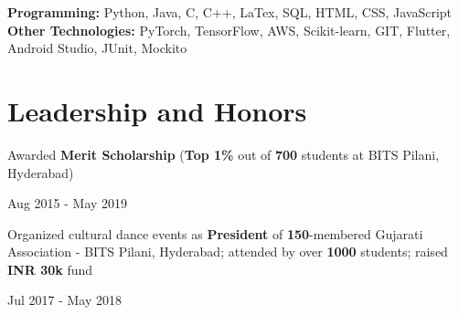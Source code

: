 \documentclass[]{Keval-resume}
\begin{document}
\textbullet{} \textbf{Programming:} Python, Java, C, C++, LaTex, SQL, HTML, CSS, JavaScript \\
\textbullet{} \textbf{Other Technologies:} PyTorch, TensorFlow, AWS, Scikit-learn, GIT, Flutter, Android Studio, JUnit, Mockito

\sectionsep

\section{Leadership and Honors} 
\hrulefill
\postsectionsep 

\begin{minipage}[t]{.78\textwidth}
	\textbullet{} Awarded \textbf{Merit Scholarship} (\textbf{Top 1\%} out of \textbf{700} students at BITS Pilani, Hyderabad)
\end{minipage}%
\begin{minipage}[t]{.22\textwidth}
	\hfill Aug 2015 - May 2019
\end{minipage}

\begin{minipage}[t]{.78\textwidth}
	\textbullet{} Organized cultural dance events as \textbf{President} of \textbf{150}-membered Gujarati Association - BITS Pilani, Hyderabad; attended by over \textbf{1000} students; raised \textbf{INR 30k} fund
\end{minipage}%
\begin{minipage}[t]{.22\textwidth}
	\hfill Jul 2017 - May 2018
\end{minipage}


\end{document}
